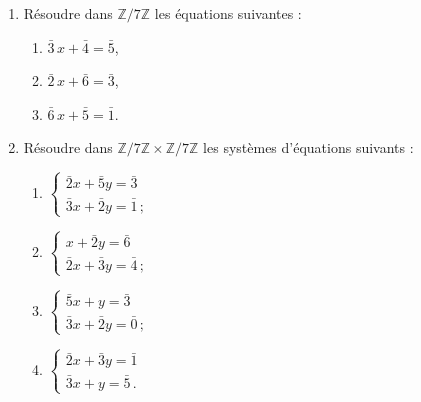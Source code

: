       \begin{exe}\label{exe:arith-5}
            \begin{enumerate}
            \item R\'esoudre dans $\mathbb{Z}/7\mathbb{Z}$ les \'equations suivantes : 
                  \begin{enumerate}
                        \item $\bar{3}\, x + \bar{4} = \bar{5}$,
                        \item $\bar{2}\, x + \bar{6} = \bar{3}$,
                        \item $\bar{6}\, x + \bar{5} = \bar{1}$.
                  \end{enumerate}
            \item R\'esoudre dans
                  $\mathbb{Z}/7\mathbb{Z}\times \mathbb{Z}/7\mathbb{Z}$
                  les syst\`emes d'\'equations suivants :
                  \begin{enumerate}
                        \item
                              $\left\lbrace
                                    \begin{array}{l}
                                          \bar{2}x + \bar{5}y = \bar{3} \\
                                          \bar{3}x + \bar{2}y = \bar{1} \,;
                                    \end{array}
                               \right.$
                        \item
                              $\left\lbrace
                                    \begin{array}{l}
                                                  x + \bar{2}y = \bar{6} \\
                                          \bar{2}x + \bar{3}y = \bar{4} \,;
                                    \end{array}
                               \right.$
                        \item
                              $\left\lbrace
                                    \begin{array}{l}
                                          \bar{5}x +         y = \bar{3} \\
                                          \bar{3}x + \bar{2}y = \bar{0} \,;
                                    \end{array}
                               \right.$
                        \item
                              $\left\lbrace
                                    \begin{array}{l}
                                          \bar{2}x + \bar{3}y = \bar{1} \\
                                          \bar{3}x +         y = \bar{5} \,.
                                    \end{array}
                               \right.$
                  \end{enumerate}
            \end{enumerate}
      \end{exe}
